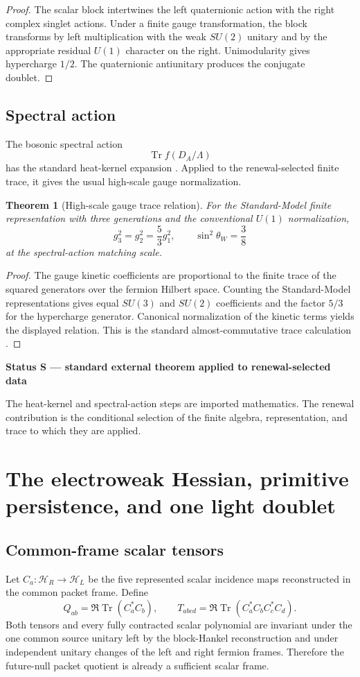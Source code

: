 \documentclass[11pt,oneside,openany]{book}
\numberwithin{equation}{chapter}
\newtheorem{theorem}{Theorem}[chapter]
\theoremstyle{definition}
\theoremstyle{remark}
\newcommand{\Tr}{\operatorname{Tr}}
\newenvironment{statusbox}[2]{%
  \par\medskip\noindent
  \begin{center}\begin{minipage}{0.94\textwidth}
  \colorbox{#1!8}{\parbox{\dimexpr\linewidth-2\fboxsep\relax}{\textbf{#2}}}\par\smallskip
}{%
  \end{minipage}\end{center}\medskip
}
\newcommand{\Standard}[1]{\begin{statusbox}{StdColor}{Status S --- standard external theorem applied to renewal-selected data}#1\end{statusbox}}
\begin{document}
\begin{proof}
The scalar block intertwines the left quaternionic action with the right complex singlet actions.  Under a finite gauge transformation, the block transforms by left multiplication with the weak $SU(2)$ unitary and by the appropriate residual $U(1)$ character on the right.  Unimodularity gives hypercharge $1/2$.  The quaternionic antiunitary produces the conjugate doublet.
\end{proof}

\section{Spectral action}
The bosonic spectral action
\[
 \Tr f(D_A/\Lambda)
\]
has the standard heat-kernel expansion \cite{ChamseddineConnes1997,VanSuijlekom2015}.  Applied to the renewal-selected finite trace, it gives the usual high-scale gauge normalization.

\begin{theorem}[High-scale gauge trace relation]
\label{thm:gauge-trace}
For the Standard-Model finite representation with three generations and the conventional $U(1)$ normalization,
\[
 \boxed{
 g_3^2=g_2^2=\frac53g_1^2,
 \qquad
 \sin^2\theta_W=\frac38
 }
\]
at the spectral-action matching scale.
\end{theorem}

\begin{proof}
The gauge kinetic coefficients are proportional to the finite trace of the squared generators over the fermion Hilbert space.  Counting the Standard-Model representations gives equal $SU(3)$ and $SU(2)$ coefficients and the factor $5/3$ for the hypercharge generator.  Canonical normalization of the kinetic terms yields the displayed relation.  This is the standard almost-commutative trace calculation \cite{ChamseddineConnesMarcolli2007,VanSuijlekom2015}.
\end{proof}

\Standard{The heat-kernel and spectral-action steps are imported mathematics.  The renewal contribution is the conditional selection of the finite algebra, representation, and trace to which they are applied.}

\chapter{The electroweak Hessian, primitive persistence, and one light doublet}
\label{ch:ew-hessian}

\section{Common-frame scalar tensors}
Let \(C_a:\mathcal H_R\to\mathcal H_L\) be the five represented scalar
incidence maps reconstructed in the common packet frame.  Define
\[
 Q_{ab}=\Re\Tr(C_a^*C_b),
 \qquad
 T_{abcd}=\Re\Tr(C_a^*C_bC_c^*C_d).
\]
Both tensors and every fully contracted scalar polynomial are invariant under
the one common source unitary left by the block-Hankel reconstruction and
under independent unitary changes of the left and right fermion frames.
Therefore the future-null packet quotient is already a sufficient scalar
frame.
\end{document}
